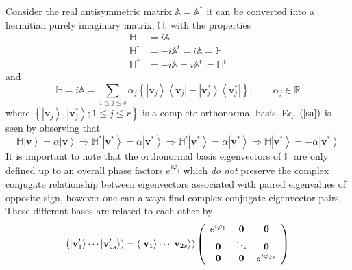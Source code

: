 \documentclass[aps,preprint]{revtex4}%
\begin{document}
Consider the real antisymmetric\emph{ }matrix $\mathbb{A}=\mathbb{A}^{\ast}$
it can be converted into a hermitian purely imaginary matrix, $\mathbb{H}$,
with the properties
\begin{align}
\mathbb{H}  &  =i\mathbb{A}\nonumber\\
\mathbb{H}^{\dagger}  &  =-i\mathbb{A}^{t}=i\mathbb{A}=\mathbb{H}\nonumber\\
\mathbb{H}^{\ast}  &  =-i\mathbb{A}=i\mathbb{A}^{t}\,=\mathbb{H}^{t}%
\end{align}
and
\begin{equation}
\mathbb{H}=i\mathbb{A}=\sum_{1\leq j\leq s}\alpha_{j}\left\{  \left\vert
\mathbf{v}_{j}\right\rangle \left\langle \mathbf{v}_{j}\right\vert -\left\vert
\mathbf{v}_{j}^{\ast}\right\rangle \left\langle \mathbf{v}_{j}^{\ast
}\right\vert \right\}  ;\qquad\alpha_{j}\in\mathbb{R} \label{sa}%
\end{equation}
where $\left\{  \left\vert \mathbf{v}_{j}\right\rangle ,\left\vert
\mathbf{v}_{j}^{\ast}\right\rangle ;1\leq j\leq r\right\}  $ is a complete
orthonormal basis. Eq. $\left(  \ref{sa}\right)  $ is seen by observing that
\begin{equation}
\mathbb{H}\left\vert \mathbf{v}\right\rangle =\alpha\left\vert \mathbf{v}%
\right\rangle \Rightarrow\mathbb{H}^{\ast}\left\vert \mathbf{v}^{\ast
}\right\rangle =\alpha\left\vert \mathbf{v}^{\ast}\right\rangle \Rightarrow
\mathbb{H}^{t}\left\vert \mathbf{v}^{\ast}\right\rangle =\alpha\left\vert
\mathbf{v}^{\ast}\right\rangle \Rightarrow\mathbb{H}\left\vert \mathbf{v}%
^{\ast}\right\rangle =-\alpha\left\vert \mathbf{v}^{\ast}\right\rangle
\end{equation}
It is important to note that the orthonormal basis eigenvectors of
$\mathbb{H}$ are only defined up to an overall phase factors $e^{i\varphi_{j}%
}$ which \emph{do not} preserve the complex conjugate relationship between
eigenvectors associated with paired eigenvalues of opposite sign, however one
can always find complex conjugate eigenvector pairs. These different bases are
related to each other by
\begin{equation}
\left(  \left\vert \mathbf{v}_{1}^{\prime}\right\rangle \cdots\left\vert
\mathbf{v}_{2s}^{\prime}\right\rangle \right)  =\left(  \left\vert
\mathbf{v}_{1}\right\rangle \cdots\left\vert \mathbf{v}_{2s}\right\rangle
\right)  \left(
\begin{array}
[c]{ccc}%
e^{i\varphi_{1}} & \mathbf{0} & \mathbf{0}\\
\mathbf{0} & \ddots & \mathbf{0}\\
\mathbf{0} & \mathbf{0} & e^{i\varphi_{2s}}%
\end{array}
\right)
\end{equation}
\end{document}
